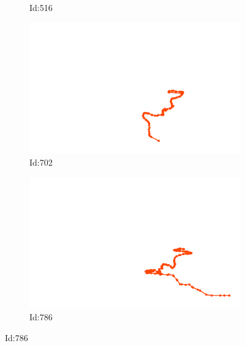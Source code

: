 \documentclass[12pt,twoside]{report}
\begin{document}
\begin{figure}
\begin{subfigure}[b]{0.20\textwidth}
\caption{Id:516}
\end{subfigure}
\begin{subfigure}[b]{0.20\textwidth}
\centering
\includegraphics[width=\textwidth]{../../trajectories/702.png}
\caption{Id:702}
\end{subfigure}
\begin{subfigure}[b]{0.20\textwidth}
\centering
\includegraphics[width=\textwidth]{../../trajectories/786.png}
\caption{Id:786}
\end{subfigure}
\end{figure}
\end{document}
